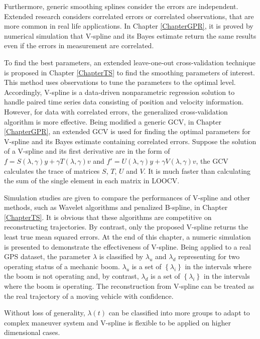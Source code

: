 Furthermore, generic smoothing splines consider the errors are independent. Extended research considers correlated errors or correlated observations, that are more common in real life applications. In Chapter \ref{ChapterGPR}, it is proved by numerical simulation that V-spline and its Bayes estimate return the same results even if the errors in measurement are correlated. 

To find the best parameters, an extended leave-one-out cross-validation technique is proposed in Chapter \ref{ChapterTS} to find the smoothing parameters of interest. This method uses observations to tune the parameters to the optimal level. Accordingly, V-spline is a data-driven nonparametric regression solution to handle paired time series data consisting of position and velocity information. However, for data with correlated errors, the generalized cross-validation algorithm is more effective. Being modified a generic GCV, in Chapter \ref{ChapterGPR}, an extended GCV is used for finding the optimal parameters for V-spline and its Bayes estimate containing correlated errors. Suppose the solution of a V-spline and its first derivative are in the form of $f=S(\lambda,\gamma)y+\gamma T(\lambda,\gamma)v$ and $f'=U(\lambda,\gamma)y+\gamma V(\lambda,\gamma)v$, the GCV calculates the trace of matrices $S$, $T$, $U$ and $V$. It is much faster than calculating the sum of the single element in each matrix in LOOCV. 

Simulation studies are given to compare the performances of V-spline and other methods, such as Wavelet algorithms and penalized B-spline, in Chapter \ref{ChapterTS}. It is obvious that these algorithms are competitive on reconstructing trajectories. By contrast, only the proposed V-spline returns the least true mean squared errors. At the end of this chapter, a numeric simulation is presented to demonstrate the effectiveness of V-spline. Being applied to a real GPS dataset, the parameter $\lambda$ is classified by $\lambda_u$ and $\lambda_d$ representing for two operating status of a mechanic boom. $\lambda_u$ is a set of $\left\lbrace\lambda_i\right\rbrace$ in the intervals where the boom is not operating and, by contrast, $\lambda_d$ is a set of $\left\lbrace\lambda_i\right\rbrace$ in the intervals where the boom is operating. The reconstruction from V-spline can be treated as the real trajectory of a moving vehicle with confidence. 

Without loss of generality, $\lambda(t)$ can be classified into more groups to adapt to complex maneuver system and V-spline is flexible to be applied on higher dimensional cases. 

